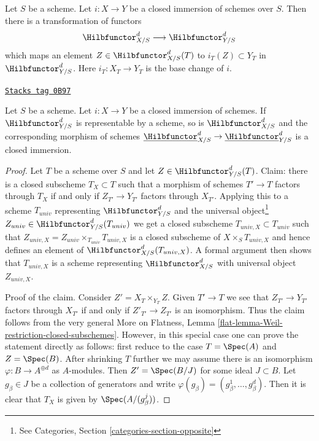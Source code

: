 Let $S$ be a scheme. Let $i : X \to Y$ be a closed immersion of schemes
over $S$. Then there is a transformation of functors
$$
\Hilbfunctor^d_{X/S} \longrightarrow \Hilbfunctor^d_{Y/S}
$$
which maps an element $Z \in \Hilbfunctor^d_{X/S}(T)$ to
$i_T(Z) \subset Y_T$ in $\Hilbfunctor^d_{Y/S}$. Here $i_T : X_T \to Y_T$
is the base change of $i$.

\begin{lemma}
\label{pic-lemma-hilb-d-of-closed}
\href{https://stacks.math.columbia.edu/tag/0B97}{\texttt{Stacks tag 0B97}}

Let $S$ be a scheme. Let $i : X \to Y$ be a closed immersion of schemes.
If $\Hilbfunctor^d_{Y/S}$ is representable by a scheme, so is
$\Hilbfunctor^d_{X/S}$ and the corresponding morphism of schemes
$\underline{\Hilbfunctor}^d_{X/S} \to \underline{\Hilbfunctor}^d_{Y/S}$
is a closed immersion.
\end{lemma}

\begin{proof}
Let $T$ be a scheme over $S$ and let $Z \in \Hilbfunctor^d_{Y/S}(T)$.
Claim: there is a closed subscheme $T_X \subset T$ such
that a morphism of schemes $T' \to T$ factors through $T_X$ if
and only if $Z_{T'} \to Y_{T'}$ factors through $X_{T'}$.
Applying this to a scheme $T_{univ}$ representing $\Hilbfunctor^d_{Y/S}$ and the
universal object\footnote{See
Categories, Section \ref{categories-section-opposite}}
$Z_{univ} \in \Hilbfunctor^d_{Y/S}(T_{univ})$
we get a closed subscheme $T_{univ, X} \subset T_{univ}$ such that
$Z_{univ, X} = Z_{univ} \times_{T_{univ}} T_{univ, X}$
is a closed subscheme of $X \times_S T_{univ, X}$ and hence
defines an element of $\Hilbfunctor^d_{X/S}(T_{univ, X})$.
A formal argument then shows that $T_{univ, X}$ is a scheme
representing $\Hilbfunctor^d_{X/S}$ with universal object $Z_{univ, X}$.

\medskip\noindent
Proof of the claim. Consider $Z' = X_T \times_{Y_T} Z$. Given $T' \to T$
we see that $Z_{T'} \to Y_{T'}$ factors through $X_{T'}$ if and
only if $Z'_{T'} \to Z_{T'}$ is an isomorphism. Thus the claim follows
from the very general
More on Flatness, Lemma \ref{flat-lemma-Weil-restriction-closed-subschemes}.
However, in this special case one can prove the statement directly as
follows: first reduce to the case $T = \Spec(A)$ and $Z = \Spec(B)$.
After shrinking $T$ further we may assume there is an isomorphism
$\varphi : B \to A^{\oplus d}$ as $A$-modules. Then $Z' = \Spec(B/J)$
for some ideal $J \subset B$. Let $g_\beta \in J$ be a collection of
generators and write $\varphi(g_\beta) = (g_\beta^1, \ldots, g_\beta^d)$.
Then it is clear that $T_X$ is given by $\Spec(A/(g_\beta^j))$.
\end{proof}

